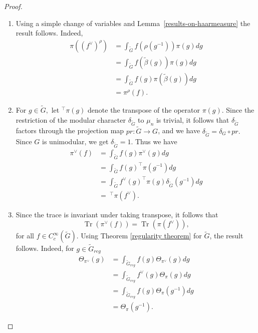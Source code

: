 \documentclass[11pt, a4paper, reqno]{amsart}
\theoremstyle{definition}
\theoremstyle{remark}
\theoremstyle{example}
\theoremstyle{note}
\numberwithin{equation}{section}
\DeclareMathOperator{\tr}{Tr}
\begin{document}
\begin{proof} \hfill 

\begin{enumerate}[label=\arabic*)] 
\item Using a simple change of variables and Lemma~\ref{results-on-haarmeasure} the result follows. Indeed,
 \begin{align*} \pi((f^{\vee})^{\rho}) &= \displaystyle\int_{\widetilde{G}} f(\rho(g^{-1})) \pi(g) dg \\
&= \int_{\widetilde{G}} f(\tilde{\beta}(g)) \pi(g) dg  \\
&= \int_{\widetilde{G}} f(g) \pi(\tilde{\beta}(g)) dg  \\
&=  \pi^{\rho}(f).
\end{align*}

\item For $g \in \widetilde{G},$ let ${}^{\top}{\pi(g)}$ denote the transpose of the operator $\pi(g).$ Since the restriction of the modular character $\delta_{\widetilde{G}}$ to $\mu_n$ is trivial, it follows that $\delta_{\widetilde{G}}$ factors through the projection map $pr: \widetilde{G} \to G$, and we have $\delta_{\widetilde{G}} = \delta_{G} \circ pr.$ Since $G$ is unimodular, we get $\delta_{\widetilde{G}} = 1.$ Thus we have 
\begin{align*}
\pi^\vee(f) &= \displaystyle\int_{\widetilde{G}} f(g) \pi^\vee(g) dg\\
&= \displaystyle\int_{\widetilde{G}} f(g)^\top\pi(g^{-1}) dg\\
&= \displaystyle\int_{\widetilde{G}} f^\vee(g)^\top\pi(g) \delta_{\widetilde{G}}(g^{-1})dg \\ 
& = ~^{\top}\pi(f^\vee). 
\end{align*}

\item Since the trace is invariant under taking transpose, it follows that $$\tr(\pi^\vee(f)) = \tr(\pi(f^\vee)),$$ for all $f \in C_c^\infty(\widetilde G).$ Using Theorem \ref{regularity theorem} for $\widetilde{G}$, the result follows. 
Indeed, for $g\in \widetilde{G}_{reg}$ 
\begin{align*}
\Theta_{\pi^{\vee}}(g) &= \int_{\widetilde{G}_{reg}} f(g)\Theta_{\pi^\vee}(g)dg \\
& = \int_{\widetilde{G}_{reg}} f^\vee(g)\Theta_{\pi}(g)dg \\
& = \int_{\widetilde{G}_{reg}} f(g)\Theta_{\pi}(g^{-1})dg\\
&= \Theta_{\pi}(g^{-1}).
\end{align*}
\end{enumerate}
\end{proof}
 
\end{document}
